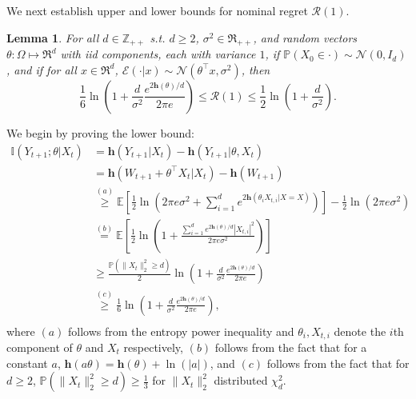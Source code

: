 \documentclass[twoside,11pt]{article}
\renewenvironment{proof}{\par\noindent{\bf Proof\ }}{\hfill\BlackBox\\[2mm]}
\newenvironment{proof}{\par\noindent{\bf Proof\ }}{\hfill\BlackBox\\[2mm]}
\newtheorem{lemma}[theorem]{Lemma}
\def\environment{\mathcal{E}}
\def\regret{\mathcal{R}}
\def\normal{\mathcal{N}}
\def\diffentropy{\bf h}
\def\E{\mathbb{E}}
\def\diffentropy{\mathbf{h}}
\def\I{\mathbb{I}}
\def\Pr{\mathbb{P}}
\begin{document}
We next establish upper and lower bounds for nominal regret $\regret(1)$.
\begin{lemma}
    \label{le:regret-lin-reg-general}
    For all $d \in \mathbb{Z}_{++}$ s.t. $d\geq 2$,  $\sigma^2 \in \Re_{++}$, and random vectors $\theta :\Omega\mapsto \Re^d$ with iid components, each with variance $1$, if $\Pr(X_0\in\cdot)\sim\normal(0, I_d)$, and if for all $x \in \Re^d$, $\environment(\cdot|x)\sim \mathcal{N}(\theta^\top x, \sigma^2)$, then
    $$\frac{1}{6}\ln\left(1 + \frac{d}{\sigma^2}\frac{e^{2\diffentropy(\theta)/d}}{2\pi e}\right) \leq \regret(1) \leq \frac{1}{2}\ln\left(1 + \frac{d}{\sigma^2}\right).$$
\end{lemma}
\begin{proof}
    We begin by proving the lower bound:
    \begin{align*}
        \I(Y_{t+1};\theta|X_t)
        & = \diffentropy(Y_{t+1}|X_t) - \diffentropy(Y_{t+1}|\theta, X_t)\\
        & = \diffentropy(W_{t+1} + \theta^\top X_t|X_t) - \diffentropy(W_{t+1})\\
        & \overset{(a)}{\geq} \E\left[\frac{1}{2}\ln\left(2\pi e\sigma^2 + \sum_{i=1}^{d}e^{2\diffentropy(\theta_i X_{t,i}|X=X)}\right)\right] - \frac{1}{2}\ln\left(2\pi e \sigma^2\right)\\
        & \overset{(b)}{=} \E\left[\frac{1}{2}\ln\left(1 + \frac{\sum_{i=1}^{d}e^{2\diffentropy(\theta)/d }|X_{t,i}|^2}{2\pi e \sigma^2}\right)\right]\\
        & \geq \frac{\Pr\left(\|X_t\|_2^2 \geq d\right)}{2}\ln\left(1 + \frac{d}{\sigma^2}\frac{e^{2\diffentropy(\theta)/d}}{2\pi e}\right)\\
        & \overset{(c)}{\geq} \frac{1}{6}\ln\left(1 + \frac{d}{\sigma^2}\frac{e^{2\diffentropy(\theta)/d}}{2\pi e}\right),\\
    \end{align*}
    where $(a)$ follows from the entropy power inequality and $\theta_i, X_{t,i}$ denote the $i$th component of $\theta$ and $X_t$ respectively, $(b)$ follows from the fact that for a constant $a$, $\diffentropy(a\theta) = \diffentropy(\theta) + \ln(|a|)$, and $(c)$ follows from the fact that for $d \geq 2$, $\Pr(\|X_t\|^2_2\geq d) \geq \frac{1}{3}$ for $\|X_t\|_2^2$ distributed $\chi^2_d$.\newline
    

\end{proof}
\end{document}
